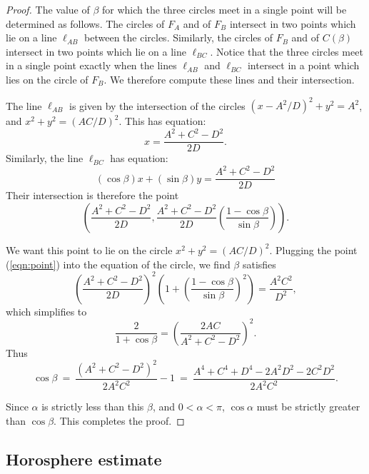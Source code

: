 \documentclass[11pt]{amsart}
\theoremstyle{plain}
\theoremstyle{definition}
\begin{document}
\begin{proof}
The value of $\beta$ for which the three circles meet in a single
point will be determined as follows.  The circles of $F_A$ and of
$F_B$ intersect in two points which lie on a line $\ell_{AB}$ between
the circles.  Similarly, the circles of $F_B$ and of $C(\beta)$
intersect in two points which lie on a line $\ell_{BC}$.  Notice that
the three circles meet in a single point exactly when the lines
$\ell_{AB}$ and $\ell_{BC}$ intersect in a point which lies on the
circle of $F_B$.  We therefore compute these lines and their
intersection.

The line $\ell_{AB}$ is given by the intersection of the circles
$(x-A^2/D)^2 + y^2 = A^2$, and $x^2 + y^2 = (AC/D)^2$.  This has
equation:
$$ x = \frac{A^2 + C^2 - D^2}{2D}.$$
Similarly, the line $\ell_{BC}$ has equation:
$$ (\cos\beta)x +(\sin\beta)y = \frac{A^2 + C^2 - D^2}{2D}$$
Their intersection is therefore the point
\begin{equation}
\left( \frac{A^2 + C^2 - D^2}{2D}, \frac{A^2 + C^2 - D^2}{2D}
	\left(\frac{1-\cos\beta}{\sin\beta}\right)\right).
\label{eqn:point}
\end{equation}

We want this point to lie on the circle $x^2 + y^2 = (AC/D)^2$.
Plugging the point (\ref{eqn:point}) into the equation of the circle,
we find $\beta$ satisfies
$$ \left( \frac{A^2 + C^2 - D^2}{2D} \right)^2 \left(1 +
\left(\frac{1-\cos\beta}{\sin\beta}\right)^2 \right) =
\frac{A^2 C^2}{D^2},$$
which simplifies to
$$
 \frac{2}{1+ \cos \beta}
= \left(\frac{2 AC}{A^2 + C^2 - D^2}\right)^2.
$$
Thus
$$\cos \beta \: = \:  \frac{(A^2 + C^2 - D^2)^2}{2A^2 C^2} - 1 \: = \: 
\frac{ A^4 + C^4 + D^4 - 2A^2 D^2 - 2 C^2 D^2}{2 A^2 C^2}.$$


Since $\alpha$ is strictly less than this $\beta$, and $0<\alpha<\pi$,
$\cos\alpha$ must be strictly greater than $\cos\beta$.  
This completes the proof.
%
\end{proof}


\subsection{Horosphere estimate}\label{subsec:large-horosphere}
\end{document}
